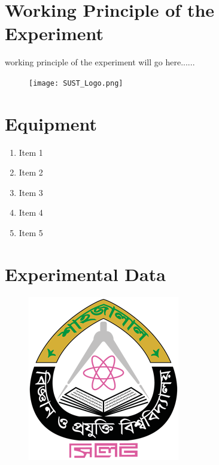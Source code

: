 \section*{Working Principle of the Experiment}
working principle of the experiment will go here......
\begin{figure}[h]
\begin{center}
\texttt{[image: SUST\_Logo.png]} %
\end{center}
\end{figure}




\section*{Equipment }
\begin{enumerate}
    \item Item 1
    \item Item 2
    \item Item 3
    \item Item 4
    \item Item 5
\end{enumerate}

\section*{Experimental Data  }
\begin{figure}[h]
\begin{center}
\includegraphics[scale=2.5]{fig/SUST_Logo.png} %
\end{center}
\end{figure}


